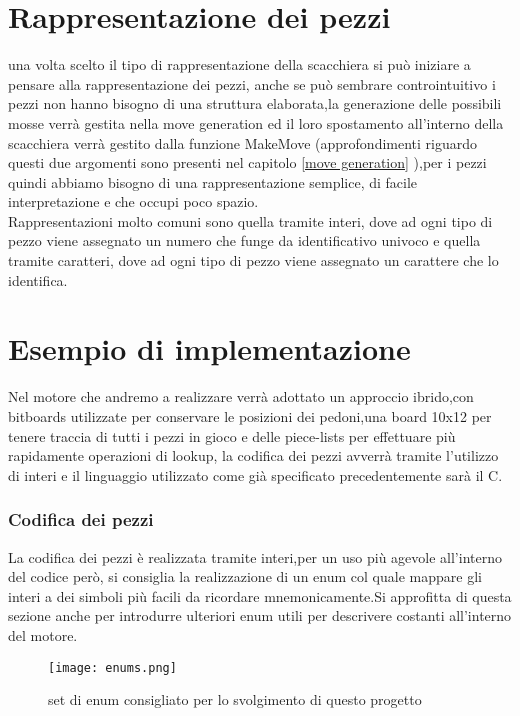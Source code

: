 \section{Rappresentazione dei pezzi}
una volta scelto il tipo di rappresentazione della scacchiera si può iniziare a pensare alla rappresentazione dei pezzi,
anche se può sembrare controintuitivo i pezzi non hanno bisogno di una struttura elaborata,la generazione delle possibili
mosse verrà gestita nella move generation ed il loro spostamento all'interno della scacchiera verrà gestito dalla funzione
MakeMove (approfondimenti riguardo questi due argomenti sono presenti nel capitolo \ref{move generation}  ),per i pezzi quindi abbiamo bisogno di una
rappresentazione semplice, di facile interpretazione e che occupi poco spazio.\\Rappresentazioni molto comuni sono quella
tramite interi, dove ad ogni tipo di pezzo viene assegnato un numero che funge da identificativo univoco e quella tramite
caratteri, dove ad ogni tipo di pezzo viene assegnato un carattere che lo identifica.


\section{Esempio di implementazione}
Nel motore che andremo a realizzare verrà adottato un approccio ibrido,con bitboards utilizzate per conservare le posizioni dei pedoni,una board 10x12 per tenere traccia di tutti i pezzi in gioco
e delle piece-lists per effettuare più rapidamente operazioni di lookup, la codifica dei pezzi avverrà tramite l'utilizzo di interi e il linguaggio utilizzato come già specificato precedentemente  sarà il C.

\subsubsection{Codifica dei pezzi} \label{codifica}
La codifica dei pezzi è realizzata tramite interi,per un uso più agevole all'interno del codice però, si consiglia la realizzazione
di un enum col quale mappare gli interi a dei simboli più facili da ricordare mnemonicamente.Si approfitta di questa sezione anche per introdurre
ulteriori enum utili per descrivere costanti all'interno del motore.
\begin{figure}[!ht]
    \texttt{[image: enums.png]}
    \caption{set di enum consigliato per lo svolgimento di questo progetto }
    \label{enums}
\end{figure}

